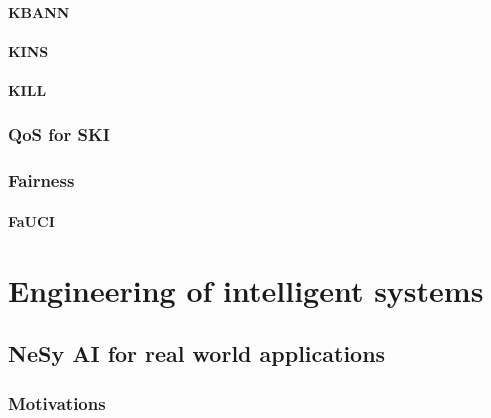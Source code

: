 \documentclass[12pt,a4paper,openright,twoside]{book}
\begin{document}
\subsection{\Acl{KBANN}}\label{subsec:kbann}

\subsection{\Acl{KINS}}\label{subsec:kins}

\subsection{\Acl{KILL}}\label{subsec:kill}

\section{\Acl{QoS} for \ac{SKI}}\label{sec:qos}

\section{Fairness}\label{sec:fairness}

\subsection{\Acl{FaUCI}}\label{subsec:fauci}


\part{Engineering of intelligent systems}\label{part:engineering-of-intelligent-systems}


\chapter{\Ac{NeSy} \ac{AI} for real world applications}\label{ch:nesy-ai-for-real-world-applications}

\section{Motivations}\label{sec:nesy-ai-motivations}
\end{document}
